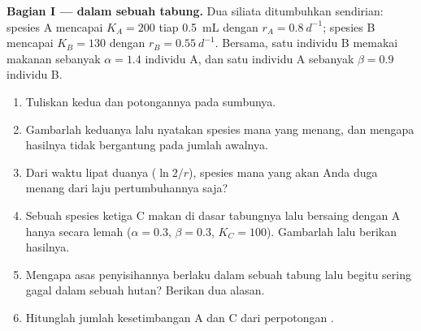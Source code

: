 \begin{problem}
\label{pb:b1:species-interactions:1}

\medskip
\noindent\textbf{Bagian I ---  dalam sebuah tabung.}
Dua siliata ditumbuhkan sendirian: spesies A mencapai $K_A = 200$ tiap
\qty{0.5}{mL} dengan $r_A = \qty{0.8}{d^{-1}}$; spesies B mencapai
$K_B = 130$ dengan $r_B = \qty{0.55}{d^{-1}}$. Bersama, satu individu
B memakai makanan sebanyak $\alpha = 1.4$ individu A, dan satu individu
A sebanyak $\beta = 0.9$ individu B.
\begin{enumerate}
  \item Tuliskan kedua  dan potongannya pada sumbunya.
  \item Gambarlah keduanya lalu nyatakan spesies mana yang menang, dan
        mengapa hasilnya tidak bergantung pada jumlah awalnya.
  \item Dari waktu lipat duanya ($\ln 2/r$), spesies mana yang akan
        Anda duga menang dari laju pertumbuhannya saja?
  \item Sebuah spesies ketiga C makan di dasar tabungnya lalu bersaing
        dengan A hanya secara lemah ($\alpha = 0.3$, $\beta = 0.3$,
        $K_C = 100$). Gambarlah  lalu berikan hasilnya.
  \item Mengapa asas penyisihannya berlaku dalam sebuah tabung lalu
        begitu sering gagal dalam sebuah hutan? Berikan dua alasan.
  \item Hitunglah jumlah kesetimbangan A dan C dari perpotongan
        .
\end{enumerate}


\end{problem}
